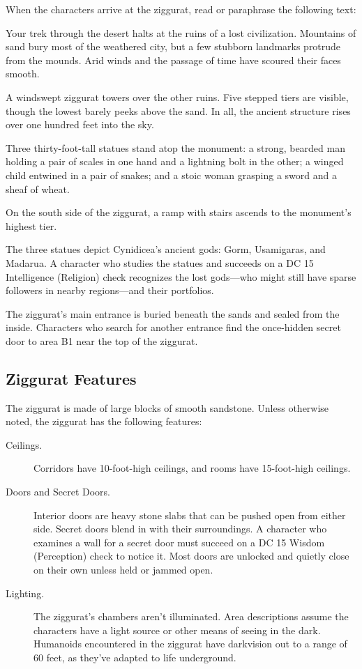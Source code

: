 \documentclass[10pt,a4paper,twoside,bg=print,twocolumn,openany,nodeprecatedcode]{dndbook}
\begin{document}
When the characters arrive at the ziggurat, read or paraphrase the following text:

\begin{DndReadAloud}{}
Your trek through the desert halts at the ruins of a lost civilization. Mountains of sand bury most of the weathered city, but a few stubborn landmarks protrude from the mounds. Arid winds and the passage of time have scoured their faces smooth.

A windswept ziggurat towers over the other ruins. Five stepped tiers are visible, though the lowest barely peeks above the sand. In all, the ancient structure rises over one hundred feet into the sky.

Three thirty-foot-tall statues stand atop the monument: a strong, bearded man holding a pair of scales in one hand and a lightning bolt in the other; a winged child entwined in a pair of snakes; and a stoic woman grasping a sword and a sheaf of wheat.

On the south side of the ziggurat, a ramp with stairs ascends to the monument's highest tier.

\end{DndReadAloud}

The three statues depict Cynidicea's ancient gods: Gorm, Usamigaras, and Madarua. A character who studies the statues and succeeds on a DC 15 Intelligence (Religion) check recognizes the lost gods—who might still have sparse followers in nearby regions—and their portfolios.

The ziggurat's main entrance is buried beneath the sands and sealed from the inside. Characters who search for another entrance find the once-hidden secret door to area B1 near the top of the ziggurat.

\subsection{Ziggurat Features}
The ziggurat is made of large blocks of smooth sandstone. Unless otherwise noted, the ziggurat has the following features:


\begin{description}
\item[Ceilings.]
Corridors have 10-foot-high ceilings, and rooms have 15-foot-high ceilings.
\item[Doors and Secret Doors.]
Interior doors are heavy stone slabs that can be pushed open from either side. Secret doors blend in with their surroundings. A character who examines a wall for a secret door must succeed on a DC 15 Wisdom (Perception) check to notice it. Most doors are unlocked and quietly close on their own unless held or jammed open.
\item[Lighting.]
The ziggurat's chambers aren't illuminated. Area descriptions assume the characters have a light source or other means of seeing in the dark. Humanoids encountered in the ziggurat have darkvision out to a range of 60 feet, as they've adapted to life underground.
\end{description}
\end{document}
